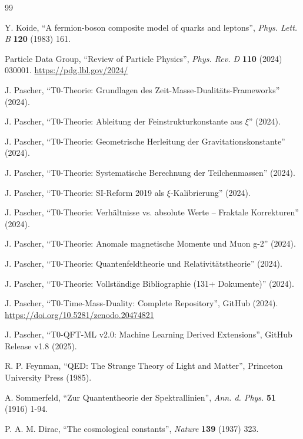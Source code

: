 	\begin{thebibliography}{99}
		
		Y. Koide, ``A fermion-boson composite model of quarks and leptons'', \textit{Phys. Lett. B} \textbf{120} (1983) 161.
		
		Particle Data Group, ``Review of Particle Physics'', \textit{Phys. Rev. D} \textbf{110} (2024) 030001. 
		\url{https://pdg.lbl.gov/2024/}
		
		J. Pascher, ``T0-Theorie: Grundlagen des Zeit-Masse-Dualitäts-Frameworks'' (2024).
		
		J. Pascher, ``T0-Theorie: Ableitung der Feinstrukturkonstante aus $\xi$'' (2024).
		
		J. Pascher, ``T0-Theorie: Geometrische Herleitung der Gravitationskonstante'' (2024).
		
		J. Pascher, ``T0-Theorie: Systematische Berechnung der Teilchenmassen'' (2024).
		
		J. Pascher, ``T0-Theorie: SI-Reform 2019 als $\xi$-Kalibrierung'' (2024).
		
		J. Pascher, ``T0-Theorie: Verhältnisse vs. absolute Werte -- Fraktale Korrekturen'' (2024).
		
		J. Pascher, ``T0-Theorie: Anomale magnetische Momente und Muon g-2'' (2024).
		
		J. Pascher, ``T0-Theorie: Quantenfeldtheorie und Relativitätstheorie'' (2024).
		
		J. Pascher, ``T0-Theorie: Vollständige Bibliographie (131+ Dokumente)'' (2024).
		
		J. Pascher, ``T0-Time-Mass-Duality: Complete Repository'', GitHub (2024). 
		\url{https://doi.org/10.5281/zenodo.20474821}
		
		J. Pascher, ``T0-QFT-ML v2.0: Machine Learning Derived Extensions'', GitHub Release v1.8 (2025).
		
		R. P. Feynman, ``QED: The Strange Theory of Light and Matter'', Princeton University Press (1985).
		
		A. Sommerfeld, ``Zur Quantentheorie der Spektrallinien'', \textit{Ann. d. Phys.} \textbf{51} (1916) 1-94.
		
		P. A. M. Dirac, ``The cosmological constants'', \textit{Nature} \textbf{139} (1937) 323.
		

\end{thebibliography}
